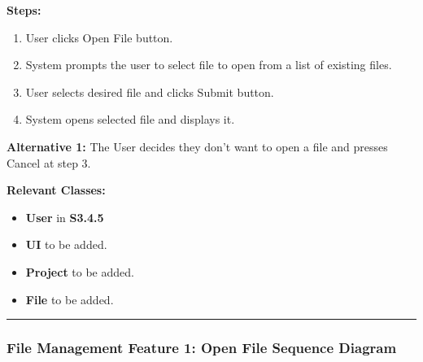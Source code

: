\documentclass[twoside,letterpaper]{article}
\begin{document}
\noindent\textbf{Steps:}
\begin{enumerate}
	\item User clicks Open File button.
	\item System prompts the user to select file to open from a list of existing files.
	\item User selects desired file and clicks Submit button.
	\item System opens selected file and displays it.
\end{enumerate}
\noindent\textbf{Alternative 1:} The User decides they don't want to open a file and presses Cancel at step 3. \newline

\noindent\textbf{Relevant Classes:}
\begin{itemize}
	\item \textbf{User} in \textbf{S3.4.5}
	\item \textbf{UI} to be added.
	\item \textbf{Project} to be added.
	\item \textbf{File} to be added.
\end{itemize}

\hrule

\newpage

\subsubsection[File Management Feature 1: Open File Sequence Diagram]{\rmfamily\bfseries\color{black}
	File Management Feature 1: Open File Sequence Diagram}
\hypertarget{RefHeading22059017292}{}
\end{document}
